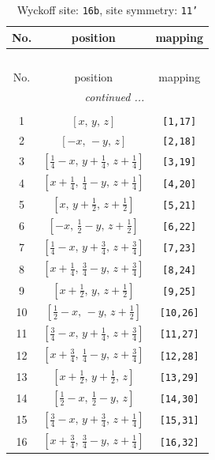 \documentclass[fleqn,8pt]{jsarticle}
\begin{document}
\begin{longtable}{ccc}
\caption{Wyckoff site: {\tt 16b}, site symmetry: {\tt 11'}}
 \\
 \hline \hline
No. & position & mapping \\ \hline \endfirsthead

\multicolumn{2}{l}{\tablename\ \thetable{}} \\
 \hline \hline
No. & position & mapping \\ \hline \endhead

 \hline \hline
\multicolumn{2}{r}{\footnotesize\it continued ...} \\ \endfoot

 \hline \hline
\multicolumn{2}{r}{} \\ \endlastfoot

1 & $\left[ x,\, y,\, z \right]$ & {\tt [1,17]} \\ \hline
2 & $\left[ - x,\, - y,\, z \right]$ & {\tt [2,18]} \\ \hline
3 & $\left[ \frac{1}{4} - x,\, y + \frac{1}{4},\, z + \frac{1}{4} \right]$ & {\tt [3,19]} \\ \hline
4 & $\left[ x + \frac{1}{4},\, \frac{1}{4} - y,\, z + \frac{1}{4} \right]$ & {\tt [4,20]} \\ \hline
5 & $\left[ x,\, y + \frac{1}{2},\, z + \frac{1}{2} \right]$ & {\tt [5,21]} \\ \hline
6 & $\left[ - x,\, \frac{1}{2} - y,\, z + \frac{1}{2} \right]$ & {\tt [6,22]} \\ \hline
7 & $\left[ \frac{1}{4} - x,\, y + \frac{3}{4},\, z + \frac{3}{4} \right]$ & {\tt [7,23]} \\ \hline
8 & $\left[ x + \frac{1}{4},\, \frac{3}{4} - y,\, z + \frac{3}{4} \right]$ & {\tt [8,24]} \\ \hline
9 & $\left[ x + \frac{1}{2},\, y,\, z + \frac{1}{2} \right]$ & {\tt [9,25]} \\ \hline
10 & $\left[ \frac{1}{2} - x,\, - y,\, z + \frac{1}{2} \right]$ & {\tt [10,26]} \\ \hline
11 & $\left[ \frac{3}{4} - x,\, y + \frac{1}{4},\, z + \frac{3}{4} \right]$ & {\tt [11,27]} \\ \hline
12 & $\left[ x + \frac{3}{4},\, \frac{1}{4} - y,\, z + \frac{3}{4} \right]$ & {\tt [12,28]} \\ \hline
13 & $\left[ x + \frac{1}{2},\, y + \frac{1}{2},\, z \right]$ & {\tt [13,29]} \\ \hline
14 & $\left[ \frac{1}{2} - x,\, \frac{1}{2} - y,\, z \right]$ & {\tt [14,30]} \\ \hline
15 & $\left[ \frac{3}{4} - x,\, y + \frac{3}{4},\, z + \frac{1}{4} \right]$ & {\tt [15,31]} \\ \hline
16 & $\left[ x + \frac{3}{4},\, \frac{3}{4} - y,\, z + \frac{1}{4} \right]$ & {\tt [16,32]} \\
\end{longtable}
\end{document}
